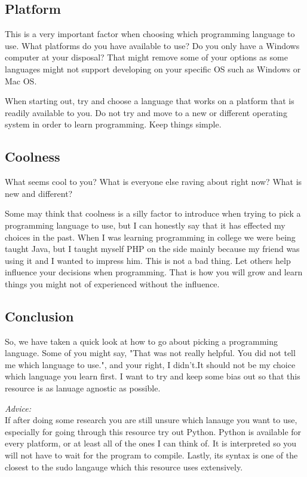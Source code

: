 \subsection{Platform}
This is a very important factor when choosing which programming language to use.
What platforms do you have available to use?
Do you only have a Windows computer at your disposal?
That might remove some of your options as some languages might not support developing on your specific OS such as Windows or Mac OS.
\par

When starting out, try and choose a language that works on a platform that is readily available to you.
Do not try and move to a new or different operating system in order to learn programming.
Keep things simple.

\subsection{Coolness}
What seems cool to you?
What is everyone else raving about right now?
What is new and different?
\par

Some may think that coolness is a silly factor to introduce when trying to pick a programming language to use, but I can honestly
say that it has effected my choices in the past.
When I was learning programming in college we were being taught Java, but I taught myself PHP on the side
mainly because my friend was using it and I wanted to impress him.
This is not a bad thing.
Let others help influence your decisions when programming. That is how you will grow and learn things you might not of
experienced without the influence.


\subsection{Conclusion}
So, we have taken a quick look at how to go about picking a programming language.
Some of you might say, "That was not really helpful. You did not tell me which language to use.", and your right, I didn't.It should not be my choice which language you learn first.
I want to try and keep some bias out so that this resource is as lanuage agnostic as possible.
\par 

\emph{Advice:}
\\
If after doing some research you are still unsure which lanauge you want to use, especially for going through this resource try out Python.
Python is available for every platform, or at least all of the ones I can think of. It is interpreted so you will not
have to wait for the program to compile. Lastly, its syntax is one of the closest to the sudo langauge which this resource
uses extensively.
